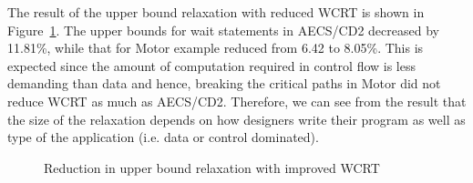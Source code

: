 The result of the upper bound relaxation with reduced WCRT is shown in
Figure~\ref{fig:graph2}.  The upper bounds for wait statements in
AECS/CD2 decreased by 11.81\%, while that for Motor example reduced from
6.42 to 8.05\%. This is expected since the amount of computation
required in control flow is less demanding than data and hence, breaking
the critical paths in Motor did not reduce WCRT as much as AECS/CD2.
Therefore, we can see from the result that the size of the relaxation
depends on how designers write their program as well as type of the
application (i.e. data or control dominated).


\begin{figure}[ht!]
	\centering
\caption{Reduction in upper bound relaxation with improved WCRT}
\label{fig:graph2}
\end{figure}


